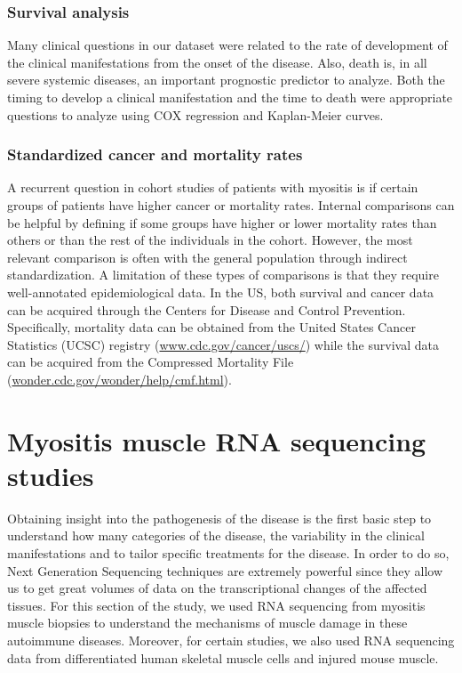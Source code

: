 \subsubsection{Survival analysis}
Many clinical questions in our dataset were related to the rate of development of the clinical manifestations from the onset of the disease. Also, death is, in all severe systemic diseases, an important prognostic predictor to analyze. Both the timing to develop a clinical manifestation and the time to death were appropriate questions to analyze using COX regression and Kaplan-Meier curves.

\subsubsection{Standardized cancer and mortality rates}
A recurrent question in cohort studies of patients with myositis is if certain groups of patients have higher cancer or mortality rates. Internal comparisons can be helpful by defining if some groups have higher or lower mortality rates than others or than the rest of the individuals in the cohort. However, the most relevant comparison is often with the general population through indirect standardization. A limitation of these types of comparisons is that they require well-annotated epidemiological data. In the US, both survival and cancer data can be acquired through the Centers for Disease and Control Prevention. Specifically, mortality data can be obtained from the United States Cancer Statistics (UCSC) registry (\url{www.cdc.gov/cancer/uscs/}) while the survival data can be acquired from the Compressed Mortality File (\url{wonder.cdc.gov/wonder/help/cmf.html}).

\section{Myositis muscle RNA sequencing studies}
Obtaining insight into the pathogenesis of the disease is the first basic step to understand how many categories of the disease, the variability in the clinical manifestations and to tailor specific treatments for the disease. In order to do so, Next Generation Sequencing techniques are extremely powerful since they allow us to get great volumes of data on the transcriptional changes of the affected tissues. For this section of the study, we used RNA sequencing from myositis muscle biopsies to understand the mechanisms of muscle damage in these autoimmune diseases. Moreover, for certain studies, we also used RNA sequencing data from differentiated human skeletal muscle cells and injured mouse muscle.

